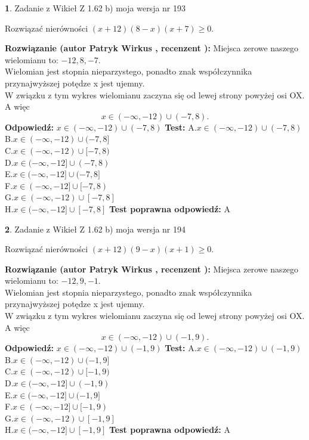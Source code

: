 \documentclass[12pt, a4paper]{article}
\theoremstyle{definition} %
\newtheorem{zad}{}
\newcommand{\zadStart}[1]{\begin{zad}#1\newline}
\newcommand{\zadStop}{\end{zad}}
\newcommand{\rozwStart}[2]{\noindent \textbf{Rozwiązanie (autor #1 , recenzent #2): }\newline}
\newcommand{\rozwStop}{\newline}
\newcommand{\odpStart}{\noindent \textbf{Odpowiedź:}\newline}
\newcommand{\odpStop}{\newline}
\newcommand{\testStart}{\noindent \textbf{Test:}\newline}
\newcommand{\testStop}{\newline}
\newcommand{\kluczStart}{\noindent \textbf{Test poprawna odpowiedź:}\newline}
\newcommand{\kluczStop}{\newline}
\begin{document}
\zadStart{Zadanie z Wikieł Z 1.62 b) moja wersja nr 193}

Rozwiązać nierówności $(x+12)(8-x)(x+7)\ge0$.
\zadStop
\rozwStart{Patryk Wirkus}{}
Miejsca zerowe naszego wielomianu to: $-12, 8, -7$.\\
Wielomian jest stopnia nieparzystego, ponadto znak współczynnika przy\linebreak najwyższej potędze x jest ujemny.\\ W związku z tym wykres wielomianu zaczyna się od lewej strony powyżej osi OX. A więc $$x \in (-\infty,-12) \cup (-7,8).$$
\rozwStop
\odpStart
$x \in (-\infty,-12) \cup (-7,8)$
\odpStop
\testStart
A.$x \in (-\infty,-12) \cup (-7,8)$\\
B.$x \in (-\infty,-12) \cup (-7,8]$\\
C.$x \in (-\infty,-12) \cup [-7,8)$\\
D.$x \in (-\infty,-12] \cup (-7,8)$\\
E.$x \in (-\infty,-12] \cup (-7,8]$\\
F.$x \in (-\infty,-12] \cup [-7,8)$\\
G.$x \in (-\infty,-12) \cup [-7,8]$\\
H.$x \in (-\infty,-12] \cup [-7,8]$
\testStop
\kluczStart
A
\kluczStop



\zadStart{Zadanie z Wikieł Z 1.62 b) moja wersja nr 194}

Rozwiązać nierówności $(x+12)(9-x)(x+1)\ge0$.
\zadStop
\rozwStart{Patryk Wirkus}{}
Miejsca zerowe naszego wielomianu to: $-12, 9, -1$.\\
Wielomian jest stopnia nieparzystego, ponadto znak współczynnika przy\linebreak najwyższej potędze x jest ujemny.\\ W związku z tym wykres wielomianu zaczyna się od lewej strony powyżej osi OX. A więc $$x \in (-\infty,-12) \cup (-1,9).$$
\rozwStop
\odpStart
$x \in (-\infty,-12) \cup (-1,9)$
\odpStop
\testStart
A.$x \in (-\infty,-12) \cup (-1,9)$\\
B.$x \in (-\infty,-12) \cup (-1,9]$\\
C.$x \in (-\infty,-12) \cup [-1,9)$\\
D.$x \in (-\infty,-12] \cup (-1,9)$\\
E.$x \in (-\infty,-12] \cup (-1,9]$\\
F.$x \in (-\infty,-12] \cup [-1,9)$\\
G.$x \in (-\infty,-12) \cup [-1,9]$\\
H.$x \in (-\infty,-12] \cup [-1,9]$
\testStop
\kluczStart
A
\kluczStop
\end{document}
